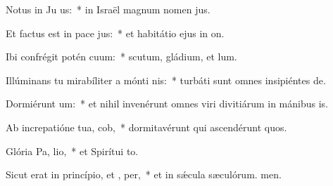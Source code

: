 \item Notus in Ju us:~* in Israël magnum nomen jus.
\item Et factus est in pace  jus:~* et habitátio ejus in on.
\item Ibi confrégit potén cuum:~* scutum, gládium, et lum.
\item Illúminans tu mirabíliter a mónti nis:~* turbáti sunt omnes insipiéntes de.
\item Dormiérunt  um:~* et nihil invenérunt omnes viri divitiárum in mánibus is.
\item Ab increpatióne tua,  cob,~* dormitavérunt qui ascendérunt quos.
\item Glória Pa,  lio,~* et Spirítui to.
\item Sicut erat in princípio, et ,  per,~* et in sǽcula sæculórum. men.

